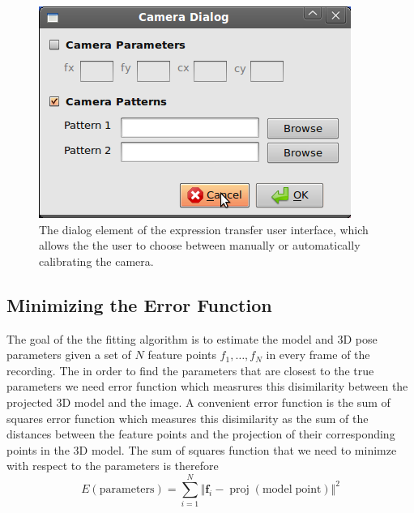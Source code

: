\documentclass[11pt,a4paper]{report}
\begin{document}
\begin{figure}[H]
\begin{centering}
\includegraphics[scale=0.60]{images/cameraDialog.png}
\par\end{centering}

\caption{The dialog element of the expression transfer user interface, which
  allows the the user to choose between manually or automatically calibrating
  the camera.}
\label{fg:camdialog}

\end{figure}

\subsection{Minimizing the Error Function}\label{s:minerror}
The goal of the the fitting algorithm is to estimate the model and 3D pose
parameters given a set of $N$ feature points $f_1, \ldots , f_N$ in every frame of the recording. The in
order to find the parameters that are closest to the true parameters we need error
function which measrures this disimilarity between the projected 3D model and
the image. A convenient error function is the sum of squares error function
which measures this disimilarity as the
sum of the distances between the feature points and the
projection of their corresponding points in the 3D model. The sum of squares
function that we need to minimze with respect to the parameters is therefore
\begin{equation}\label{eq:fit0}
E(\mathrm{parameters}) = \sum_{i=1}^N \Big\Vert\mathbf{f}_i - \mathop{proj}(\mathrm{model\; point})\Big\Vert^2
\end{equation}
\end{document}
